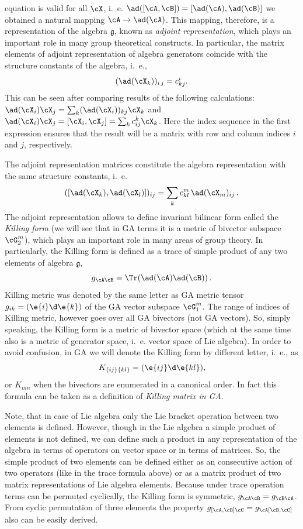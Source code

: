 \begin{unit}
equation is valid for all $\cX$,  i.~e. $\ad([\cA,\cB])=
[\ad(\cA),\ad(\cB)]$ we obtained a natural mapping
$\cA\to\ad(\cA)$. This mapping, therefore, is a representation of
the algebra $\mathfrak{g}$, known as {\it adjoint representation},
which plays an important role in many group theoretical
constructs. In particular, the matrix elements of adjoint
representation of algebra generators coincide with the structure constants
of the algebra, i.~e., 
\[(\ad(\cX_k))_{i\,j}=c_{kj}^i.\] 
This can be seen after
comparing results of the following calculations:
$\ad(\cX_i)\cX_j=\sum_k (\ad(\cX_i))_{kj} \cX_k$ and
$\ad(\cX_i)\cX_j= [\cX_i,\cX_j]= \sum_k c_{ij}^k\cX_k$. Here the
index sequence in the first expression ensures that the result
will be a matrix with row and column indices $i$ and $j$,
respectively.

The adjoint representation matrices constitute the algebra
representation with the same structure constants, i.~e.
\[
  ([\ad(\cX_k),\ad(\cX_l)])_{ij}=\sum_k c_{kl}^m\, \ad(\cX_m)_{ij}\,.
\]
The adjoint representation allows to define invariant bilinear
form called the {\it Killing form} (we will see that in GA terms it is a metric of
bivector subspace $\cG_2^m$), which plays an important role in
many areas of group theory. In particularly, the Killing form is
defined as a trace of simple product of any two elements of
algebra $\mathfrak{g}$,
\[
  g_{\cA\cB}=\Tr(\ad(\cA)\ad(\cB ))\,.
\]
Killing metric was denoted by the same letter as GA metric tensor
$g_{ik}=(\e{i}\d\e{k})$ of the GA vector subspace $\cG_1^m$.
The range of indices of Killing metric, however goes over all GA
bivectors (not GA vectors). So, simply speaking, the Killing form
is a metric of bivector space (which at the same time also is a
metric of generator space, i.~e. vector space of Lie algebra). In
order to avoid confusion, in GA we will denote the Killing form by
different letter, i.~e., as
 \[K_{\{ij\}\{kl\}}=(\e{ij}\d\e{kl}),\]
or $K_{mn}$ when the bivectors are enumerated in a canonical order.
In fact this formula can be taken as a definition of \textit{Killing matrix in
GA}.

Note, that in case of Lie algebra only the Lie bracket operation
between two elements is defined. However, though in the Lie
algebra a simple product of elements is not defined, we can define such a
product in any representation of the algebra in terms of operators
on vector space or in terms of matrices. So, the simple product of
two elements can be defined either as an consecutive action of two
operators (like in the trace formula above) or as a matrix product
of two matrix representations of Lie algebra elements. Because
under trace operation terms can be permuted cyclically, the
Killing form is symmetric, $g_{\cA\cB}=g_{\cB\cA}$. From cyclic
permutation of three elements the property
$g_{[\cA,\cB]\cC}=g_{\cA[\cB,\cC]}$ also can be easily derived.


\end{unit}
